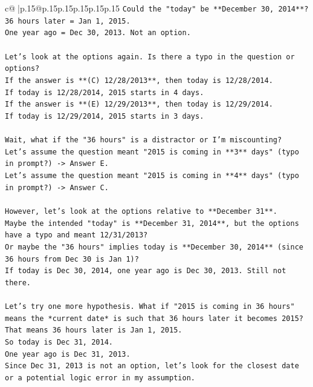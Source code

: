 \documentclass{article}
\begin{document}
{\begin{supertabular}{c@{$\;$}|p{.15\linewidth}@{}p{.15\linewidth}p{.15\linewidth}p{.15\linewidth}p{.15\linewidth}p{.15\linewidth}}
{{{\texttt{Could the "today" be **December 30, 2014**?} \\
\texttt{36 hours later = Jan 1, 2015.} \\
\texttt{One year ago = Dec 30, 2013. Not an option.} \\
\\ 
\texttt{Let's look at the options again. Is there a typo in the question or options?} \\
\texttt{If the answer is **(C) 12/28/2013**, then today is 12/28/2014.} \\
\texttt{If today is 12/28/2014, 2015 starts in 4 days.} \\
\texttt{If the answer is **(E) 12/29/2013**, then today is 12/29/2014.} \\
\texttt{If today is 12/29/2014, 2015 starts in 3 days.} \\
\\ 
\texttt{Wait, what if the "36 hours" is a distractor or I'm miscounting?} \\
\texttt{Let's assume the question meant "2015 is coming in **3** days" (typo in prompt?) {-}> Answer E.} \\
\texttt{Let's assume the question meant "2015 is coming in **4** days" (typo in prompt?) {-}> Answer C.} \\
\\ 
\texttt{However, let's look at the options relative to **December 31**.} \\
\texttt{Maybe the intended "today" is **December 31, 2014**, but the options have a typo and meant 12/31/2013?} \\
\texttt{Or maybe the "36 hours" implies today is **December 30, 2014** (since 36 hours from Dec 30 is Jan 1)?} \\
\texttt{If today is Dec 30, 2014, one year ago is Dec 30, 2013. Still not there.} \\
\\ 
\texttt{Let's try one more hypothesis. What if "2015 is coming in 36 hours" means the *current date* is such that 36 hours later it becomes 2015?} \\
\texttt{That means 36 hours later is Jan 1, 2015.} \\
\texttt{So today is Dec 31, 2014.} \\
\texttt{One year ago is Dec 31, 2013.} \\
\texttt{Since Dec 31, 2013 is not an option, let's look for the closest date or a potential logic error in my assumption.} \\
\\ 
}}}
\end{supertabular}}
\end{document}
